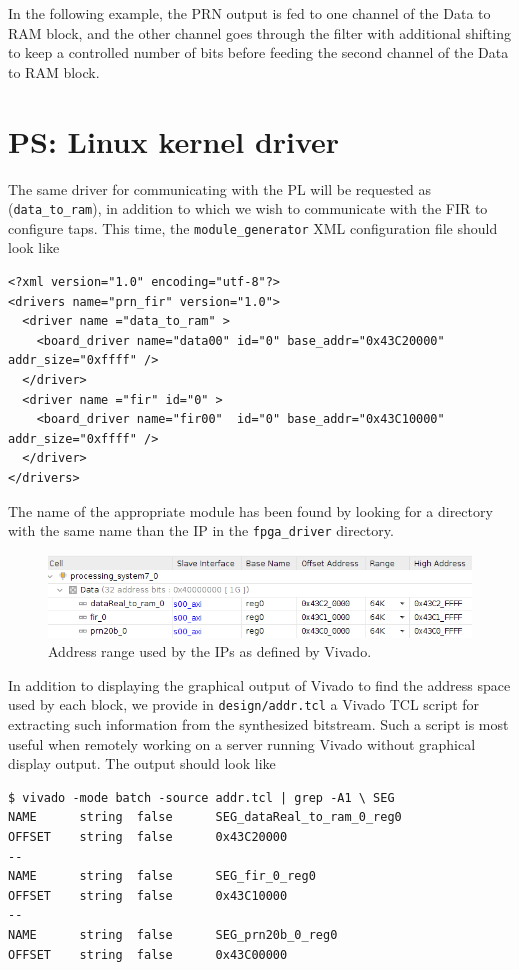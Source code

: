 \documentclass[12pt,oneside]{article}
\begin{document}
In the following example, the PRN output is fed to one channel of the Data to RAM block, and the
other channel goes through the filter with additional shifting to keep a controlled number of bits
before feeding the second channel of the Data to RAM block.

\section{PS: Linux kernel driver}

The same driver for communicating with the PL will be requested as
({\tt data\_to\_ram}), in addition to which we wish to communicate with
the FIR to configure taps. This time, the {\tt module\_generator} XML 
configuration file should look like

{\footnotesize
\begin{verbatim}
<?xml version="1.0" encoding="utf-8"?>
<drivers name="prn_fir" version="1.0">
  <driver name ="data_to_ram" >
    <board_driver name="data00" id="0" base_addr="0x43C20000" addr_size="0xffff" />
  </driver>
  <driver name ="fir" id="0" >
    <board_driver name="fir00"  id="0" base_addr="0x43C10000" addr_size="0xffff" />
  </driver>
</drivers>
\end{verbatim}
}

The name of the appropriate module has been found by looking for a directory
with the same name than the IP in the {\tt fpga\_driver} directory.

\begin{figure}[h!tb]
\includegraphics[width=\linewidth]{address}
\caption{Address range used by the IPs as defined by Vivado.}
\label{addr}
\end{figure}

In addition to displaying the graphical output of Vivado to find the address space used by
each block, we provide in {\tt design/addr.tcl} a Vivado TCL script for extracting such information
from the synthesized bitstream. Such a script is most useful when remotely working on a server
running Vivado without graphical display output. The output should look like

{\footnotesize
\begin{verbatim}
$ vivado -mode batch -source addr.tcl | grep -A1 \ SEG
NAME      string  false      SEG_dataReal_to_ram_0_reg0
OFFSET    string  false      0x43C20000
--
NAME      string  false      SEG_fir_0_reg0
OFFSET    string  false      0x43C10000
--
NAME      string  false      SEG_prn20b_0_reg0
OFFSET    string  false      0x43C00000
\end{verbatim}
}
\end{document}
